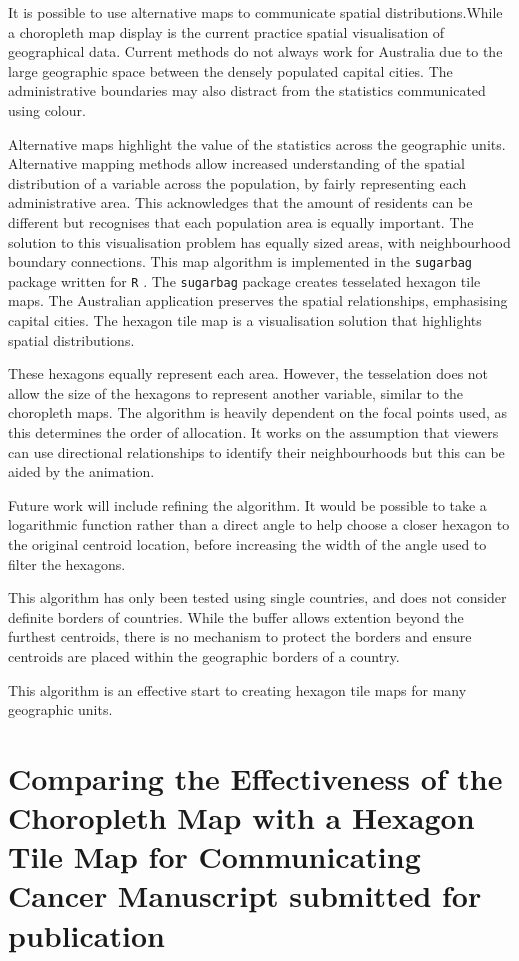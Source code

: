 \documentclass{monashthesis}
\begin{document}
It is possible to use alternative maps to communicate spatial distributions.While a choropleth map display is the current practice spatial visualisation of geographical data. Current methods do not always work for Australia due to the large geographic space between the densely populated capital cities. The administrative boundaries may also distract from the statistics communicated using colour.

Alternative maps highlight the value of the statistics across the geographic units. Alternative mapping methods allow increased understanding of the spatial distribution of a variable across the population, by fairly representing each administrative area. This acknowledges that the amount of residents can be different but recognises that each population area is equally important. The solution to this visualisation problem has equally sized areas, with neighbourhood boundary connections. This map algorithm is implemented in the \texttt{sugarbag} \autocite{sugarbag} package written for \texttt{R} \autocite{R}.
The \texttt{sugarbag} package creates tesselated hexagon tile maps. The Australian application preserves the spatial relationships, emphasising capital cities. The hexagon tile map is a visualisation solution that highlights spatial distributions.

These hexagons equally represent each area. However, the tesselation does not allow the size of the hexagons to represent another variable, similar to the choropleth maps.
The algorithm is heavily dependent on the focal points used, as this determines the order of allocation. It works on the assumption that viewers can use directional relationships to identify their neighbourhoods but this can be aided by the animation.

Future work will include refining the algorithm. It would be possible to take a logarithmic function rather than a direct angle to help choose a closer hexagon to the original centroid location, before increasing the width of the angle used to filter the hexagons.

This algorithm has only been tested using single countries, and does not consider definite borders of countries. While the buffer allows extention beyond the furthest centroids, there is no mechanism to protect the borders and ensure centroids are placed within the geographic borders of a country.

This algorithm is an effective start to creating hexagon tile maps for many geographic units.

\hypertarget{ch:experiment}{%
\chapter{Comparing the Effectiveness of the Choropleth Map with a Hexagon Tile Map for Communicating Cancer Manuscript submitted for publication}\label{ch:experiment}}
\end{document}
